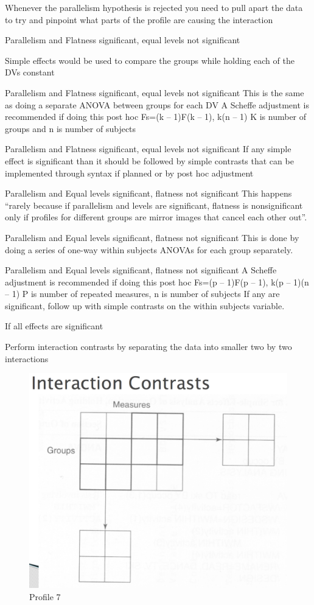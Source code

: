 \documentclass[]{book}
\theoremstyle{definition}
\theoremstyle{definition}
\theoremstyle{definition}
\theoremstyle{remark}
\begin{document}
{Whenever the parallelism hypothesis is rejected you need to pull apart
the data to try and pinpoint what parts of the profile are causing the
interaction

Parallelism and Flatness significant, equal levels not significant

Simple effects would be used to compare the groups while holding each of
the DVs constant

Parallelism and Flatness significant, equal levels not significant This
is the same as doing a separate ANOVA between groups for each DV A
Scheffe adjustment is recommended if doing this post hoc Fs=(k -- 1)F(k
-- 1), k(n -- 1) K is number of groups and n is number of subjects

Parallelism and Flatness significant, equal levels not significant If
any simple effect is significant than it should be followed by simple
contrasts that can be implemented through syntax if planned or by post
hoc adjustment

Parallelism and Equal levels significant, flatness not significant This
happens ``rarely because if parallelism and levels are significant,
flatness is nonsignificant only if profiles for different groups are
mirror images that cancel each other out''.

Parallelism and Equal levels significant, flatness not significant This
is done by doing a series of one-way within subjects ANOVAs for each
group separately.

Parallelism and Equal levels significant, flatness not significant A
Scheffe adjustment is recommended if doing this post hoc Fs=(p -- 1)F(p
-- 1), k(p -- 1)(n -- 1) P is number of repeated measures, n is number
of subjects If any are significant, follow up with simple contrasts on
the within subjects variable.

If all effects are significant

Perform interaction contrasts by separating the data into smaller two by
two interactions

\begin{figure}
\centering
\includegraphics{img/jhprofile7.png}
\caption{Profile 7}
\end{figure}

}
\end{document}

